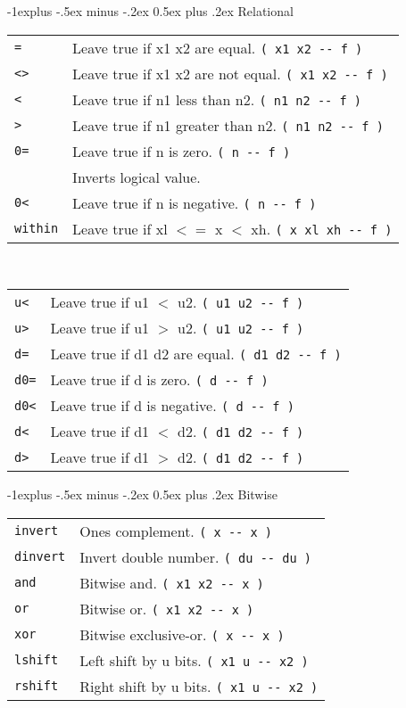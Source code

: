 \documentclass[10pt,landscape,a4paper]{article}
\makeatletter
\renewcommand{\subsection}{\@startsection{subsection}{2}{0mm}%
                                {-1explus -.5ex minus -.2ex}%
                                {0.5ex plus .2ex}%
                                {\normalfont\normalsize\bfseries}}
\makeatother
\begin{document}
\begin{multicols}{3}
\subsection{Relational}
\begin{tabular}{@{}ll@{}}
\verb!=!  & Leave true if x1 x2 are equal. \verb!( x1 x2 -- f )! \\
\verb!<>!  &  Leave true if x1 x2 are not equal. \verb!( x1 x2 -- f )! \\
\verb!<!  &  Leave true if n1 less than n2. \verb!( n1 n2 -- f )! \\
\verb!>!  &  Leave true if n1 greater than n2. \verb!( n1 n2 -- f )! \\
\verb!0=!  &  Leave true if n is zero. \verb!( n -- f )! \\
           & Inverts logical value. \\
\verb!0<!  &  Leave true if n is negative. \verb!( n -- f )! \\
\verb!within! & Leave true if xl $<=$ x $<$ xh. \verb!( x xl xh -- f )! \\
\end{tabular} \\
\begin{tabular}{@{}ll@{}}
\verb!u<!  & Leave true if u1 $<$ u2. \verb!( u1 u2 -- f )! \\
\verb!u>!  & Leave true if u1 $>$ u2. \verb!( u1 u2 -- f )! \\
\verb!d=!  & Leave true if d1 d2 are equal. \verb!( d1 d2 -- f )! \\
\verb!d0=!  & Leave true if d is zero. \verb!( d -- f )! \\
\verb!d0<!  & Leave true if d is negative. \verb!( d -- f )! \\
\verb!d<!  & Leave true if d1 $<$ d2. \verb!( d1 d2 -- f )! \\
\verb!d>!  & Leave true if d1 $>$ d2. \verb!( d1 d2 -- f )! \\
\end{tabular}

\subsection{Bitwise}
\begin{tabular}{@{}ll@{}}
\verb!invert!  & Ones complement. \verb!( x -- x )! \\
\verb!dinvert!  & Invert double number.  \verb!( du -- du )! \\
\verb!and!  & Bitwise and. \verb!( x1 x2 -- x )! \\
\verb!or!  & Bitwise or. \verb!( x1 x2 -- x )! \\
\verb!xor!  & Bitwise exclusive-or. \verb!( x -- x )! \\
\verb!lshift!  & Left shift by u bits. \verb!( x1 u -- x2 )! \\
\verb!rshift!  & Right shift by u bits. \verb!( x1 u -- x2 )! \\
\end{tabular}\\


\end{multicols}
\end{document}
